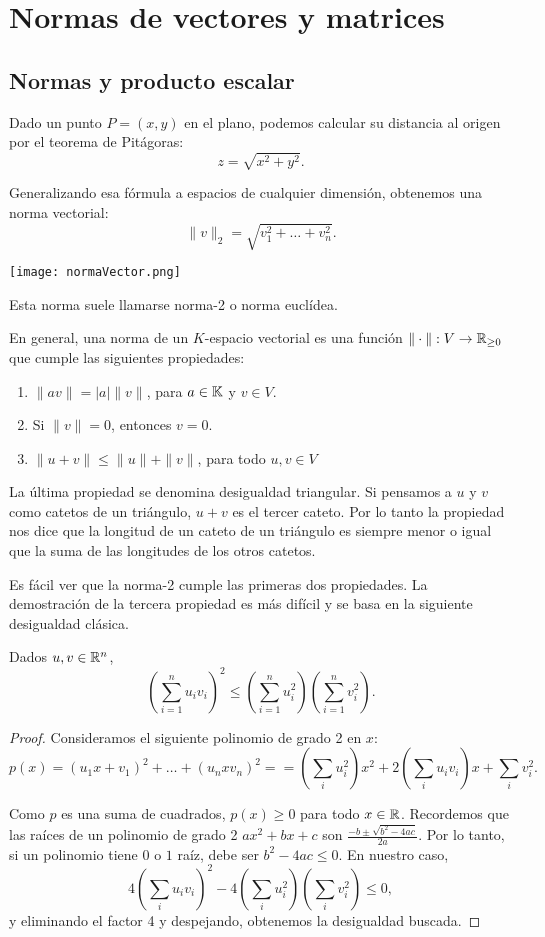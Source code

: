 \chapter{Normas de vectores y matrices}
\section{Normas y producto escalar}


Dado un punto $P = (x,y)$ en el plano, podemos calcular su distancia al origen por el teorema de Pitágoras:
$$
z = \sqrt{x^2 + y^2}.
$$

Generalizando esa fórmula a espacios de cualquier dimensión, obtenemos una norma vectorial:
$$
\|v\|_2 = \sqrt{v_1^2 + \dots + v_n^2}.
$$

\texttt{[image: normaVector.png]}

Esta norma suele llamarse norma-2 o norma euclídea.

En general, una norma de un $K$-espacio vectorial es una función $\| \cdot \| : V \rightarrow \mathbb R_{\ge 0}$ que cumple las siguientes propiedades:
\begin{enumerate}
\item $\|a v\| = |a| \|v\|$, para $a \in \mathbb K$ y $v \in V$.
\item Si $\|v\| = 0$, entonces $v = 0$.
\item $\|u + v\| \le \|u\| + \|v\|$, para todo $u, v \in V$
\end{enumerate}

La \'ultima propiedad se denomina desigualdad triangular. Si pensamos a $u$ y $v$ como catetos de un tri\'angulo, $u + v$ es el tercer cateto. Por lo tanto la propiedad nos dice que la longitud de un cateto de un triángulo es siempre menor o igual que la suma de las longitudes de los otros catetos.

Es fácil ver que la norma-2 cumple las primeras dos propiedades.  La demostraci\'on de la tercera propiedad es m\'as dif\'icil y se basa en la siguiente desigualdad clásica.

\begin{prop}
Dados $u, v \in \mathbb R^n$,
$$
\left(\sum_{i=1}^{n} u_{i}v_{i}\right)^{2}\leq \left(\sum_{i=1}^{n}u_{i}^{2}\right)\left(\sum_{i=1}^{n}v_{i}^{2}\right).
$$
\end{prop}
\begin{proof}
Consideramos el siguiente polinomio de grado 2 en $x$:
$$
p(x) = (u_1 x + v_1)^2 + \dots + (u_n x v_n)^2 = =\left(\sum _{i}u_{i}^{2}\right)x^{2}+2\left(\sum _{i}u_{i}v_{i}\right)x+\sum _{i}v_{i}^{2}.
$$

Como $p$ es una suma de cuadrados, $p(x) \ge 0$ para todo $x \in \mathbb R$. Recordemos que las raíces de un polinomio de grado 2 $ax^2 + bx + c$ son $\frac{-b \pm \sqrt{b^2 - 4ac}}{2a}$. Por lo tanto, si un polinomio tiene $0$ o $1$ ra\'iz, debe ser $b^2-4ac \le 0$. En nuestro caso,
$$
4 \left(\sum _{i}u_{i}v_{i}\right)^{2}- 4 \left(\sum _{i}{u_{i}^{2}}\right)\left(\sum _{i}{v_{i}^{2}}\right)\leq 0,
$$
y eliminando el factor 4 y despejando, obtenemos la desigualdad buscada.
\end{proof}

